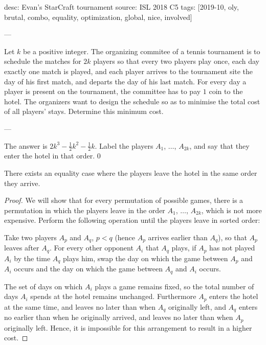 desc: Evan's StarCraft tournament
source: ISL 2018 C5
tags: [2019-10, oly, brutal, combo, equality, optimization, global, nice, involved]

---

Let $k$ be a positive integer. The organizing commitee of a tennis tournament is to schedule the matches for $2k$ players so that every two players play once, each day exactly one match is played, and each player arrives to the tournament site the day of his first match, and departs the day of his last match. For every day a player is present on the tournament, the committee has to pay $1$ coin to the hotel. The organizers want to design the schedule so as to minimise the total cost of all players' stays. Determine this minimum cost.

---

The answer is $2k^3-\frac12k^2-\frac12k$. Label the players $A_1$, $\ldots$, $A_{2k}$, and say that they enter the hotel in that order.
\setcounter{claim}0
\begin{claim}
    There exists an equality case where the players leave the hotel in the same order they arrive.
\end{claim}
\begin{proof}
    We will show that for every permutation of possible games, there is a permutation in which the players leave in the order $A_1$, $\ldots$, $A_{2k}$, which is not more expensive. Perform the following operation until the players leave in sorted order:

    Take two players $A_p$ and $A_q$, $p<q$ (hence $A_p$ arrives earlier than $A_q$), so that $A_p$ leaves after $A_q$. For every other opponent $A_i$ that $A_q$ plays, if $A_p$ has not played $A_i$ by the time $A_q$ plays him, swap the day on which the game between $A_p$ and $A_i$ occurs and the day on which the game between $A_q$ and $A_i$ occurs.

    The set of days on which $A_i$ plays a game remains fixed, so the total number of days $A_i$ spends at the hotel remains unchanged. Furthermore $A_p$ enters the hotel at the same time, and leaves no later than when $A_q$ originally left, and $A_q$ enters no earlier than when he originally arrived, and leaves no later than when $A_p$ originally left. Hence, it is impossible for this arrangement to result in a higher cost.
\end{proof}

